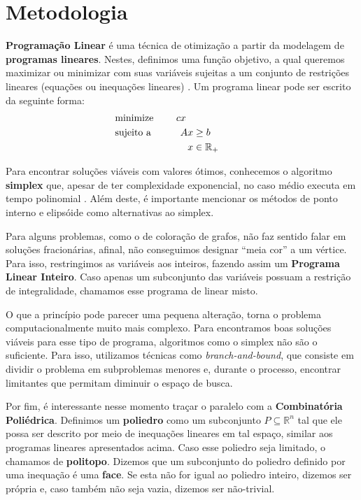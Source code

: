 \documentclass[10pt]{article}
\begin{document}
\section{Metodologia}
\label{sec:org7d3602a}
\label{metodologia}
\textbf{Programação Linear} é uma técnica de otimização a partir da modelagem de \textbf{programas lineares}.
Nestes, definimos uma função objetivo, a qual queremos maximizar ou minimizar com suas variáveis sujeitas a um conjunto de restrições lineares (equações ou inequações lineares) \autocite{Chvatal1983LinearProgramming} . Um programa linear pode ser escrito da seguinte forma:
\begin{alignat*}{4}
& \omit\rlap{minimize \quad \quad $\displaystyle cx$} \\
& \mbox{sujeito a}&& \quad & Ax & \geq b  & \quad &  \\
&                 &&       & x               & \in \mathbb{R}_+ &      &
\end{alignat*}

Para encontrar soluções viáveis com valores ótimos, conhecemos o algoritmo \textbf{simplex} que, apesar de ter complexidade exponencial, no caso médio executa em tempo polinomial \autocite{Borgwardt1986SimplexMethodAlgorithms}.
Além deste, é importante mencionar os métodos de ponto interno \autocite{Karmarkar1984newpolynomialtime} e elipsóide \autocite{Bland1981FeatureArticleTheEllipsoid} como alternativas ao simplex.

Para alguns problemas, como o de coloração de grafos, não faz sentido falar em soluções fracionárias, afinal, não conseguimos designar ``meia cor'' a um vértice.
Para isso, restringimos as variáveis aos inteiros, fazendo assim um \textbf{Programa Linear Inteiro}. Caso apenas um subconjunto das variáveis possuam a restrição de integralidade, chamamos esse programa de linear misto.

O que a princípio pode parecer uma pequena alteração, torna o problema computacionalmente muito mais complexo.
Para encontramos boas soluções viáveis para esse tipo de programa, algoritmos como o simplex não são o suficiente.
Para isso, utilizamos técnicas como \emph{branch-and-bound}, que consiste em dividir o problema em subproblemas menores e, durante o processo, encontrar limitantes que permitam diminuir o espaço de busca.

Por fim, é interessante nesse momento traçar o paralelo com a \textbf{Combinatória Poliédrica}.
Definimos um \textbf{poliedro} como um subconjunto \(P \subseteq \mathbb{R}^n\) tal que ele possa ser descrito por meio de inequações lineares em tal espaço, similar aos programas lineares apresentados acima.
Caso esse poliedro seja limitado, o chamamos de \textbf{politopo}.
Dizemos que um subconjunto do poliedro definido por uma inequação é uma \textbf{face}.
Se esta não for igual ao poliedro inteiro, dizemos ser própria e, caso também não seja vazia, dizemos ser não-trivial.
\end{document}
